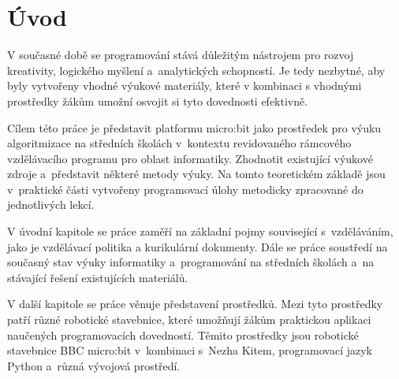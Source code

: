 \documentclass[
  digital,     %
  oneside,     %
  nosansbold,  %
  colorbold, %
  lof,         %
  nolot,         %
]{fithesis4}
\begin{document}

\chapter{Úvod}

V současné době se programování stává důležitým nástrojem pro rozvoj kreativity, logického myšlení a~analytických schopností.  Je tedy nezbytné, aby byly vytvořeny vhodné výukové materiály, které v kombinaci s vhodnými prostředky žákům umožní osvojit si tyto dovednosti efektivně.

Cílem této práce je představit platformu micro:bit jako prostředek pro výuku algoritmizace na středních školách v~kontextu revidovaného rámcového vzdělávacího programu pro oblast informatiky. Zhodnotit existující výukové zdroje a~představit některé metody výuky. Na tomto teoretickém základě jsou v~praktické části vytvořeny programovací úlohy metodicky zpracované do jednotlivých lekcí.

V úvodní kapitole se práce zaměří na základní pojmy související s~vzděláváním, jako je vzdělávací politika a kurikulární dokumenty. Dále se práce soustředí na současný stav výuky informatiky a~programování na středních školách a~na stávající řešení existujících materiálů. %

V další kapitole se práce věnuje představení prostředků. Mezi tyto prostředky patří různé robotické stavebnice, které umožňují žákům praktickou aplikaci naučených programovacích dovedností. Těmito prostředky jsou robotické stavebnice BBC micro:bit v~kombinaci s~Nezha Kitem, programovací jazyk Python a~různá vývojová prostředí.
\end{document}

